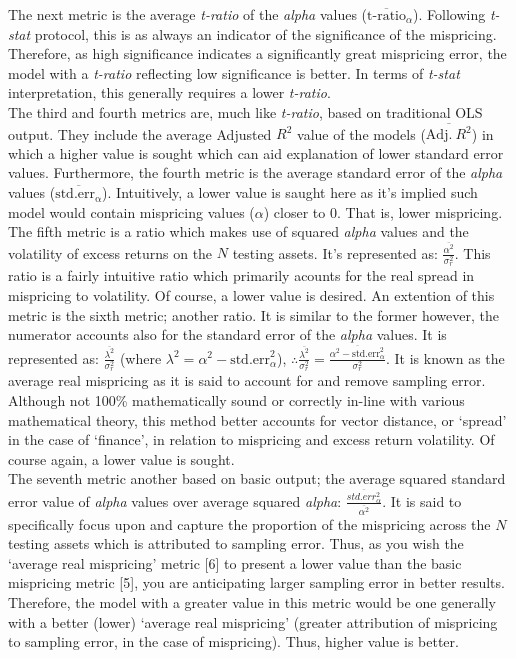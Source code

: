 \documentclass[11pt, english]{article}
\begin{document}
        The next metric is the average \textit{t-ratio} of the \textit{alpha} values ($\overline{\textrm{t-ratio}}_{\alpha}$). Following \textit{t-stat} protocol, this is as always an indicator of the significance of the mispricing. Therefore, as high significance indicates a significantly great mispricing error, the model with a \textit{t-ratio} reflecting low significance is better. In terms of \textit{t-stat} interpretation, this generally requires a lower \textit{t-ratio}.\\

        The third and fourth metrics are, much like \textit{t-ratio}, based on traditional OLS output. They include the average Adjusted $R^2$ value of the models ($\overline{\mathrm{Adj.}\ R^2}$) in which a higher value is sought which can aid explanation of lower standard error values. Furthermore, the fourth metric is the average standard error of the \textit{alpha} values ($\overline{\mathrm{std.err_{\alpha}}}$). Intuitively, a lower value is saught here as it's implied such model would contain mispricing values ($\alpha$) closer to 0. That is, lower mispricing.\\

        The fifth metric is a ratio which makes use of squared \textit{alpha} values and the volatility of excess returns on the $N$ testing assets. It's represented as: $\frac{\overline{\alpha^2}}{\sigma_r^2}$. This ratio is a fairly intuitive ratio which primarily acounts for the real spread in mispricing to volatility. Of course, a lower value is desired. An extention of this metric is the sixth metric; another ratio. It is similar to the former however, the numerator accounts also for the standard error of the \textit{alpha} values. It is represented as: $\frac{\overline{\lambda^2}}{\sigma_r^2}$ (where $\lambda^2=\alpha^2-\textrm{std.err}_{\alpha}^2$), $\therefore\frac{\overline{\lambda^2}}{\sigma_r^2}=\frac{\overline{\alpha^2-\textrm{std.err}_{\alpha}^2}}{\sigma_r^2}$. It is known as the average real mispricing as it is said to account for and remove sampling error. Although not 100\% mathematically sound or correctly in-line with various mathematical theory, this method better accounts for vector distance, or `spread' in the case of `finance', in relation to mispricing and excess return volatility. Of course again, a lower value is sought.\\

        The seventh metric another based on basic output; the average squared standard error value of \textit{alpha} values over average squared \textit{alpha}: $\frac{\overline{std.err_{\alpha}^2}}{\overline{\alpha^2}}$. It is said to specifically focus upon and capture the proportion of the mispricing across the $N$ testing assets which is attributed to sampling error. Thus, as you wish the `average real mispricing' metric [6] to present a lower value than the basic mispricing metric [5], you are anticipating larger sampling error in better results. Therefore, the model with a greater value in this metric would be one generally with a better (lower) `average real mispricing' (greater attribution of mispricing to sampling error, in the case of mispricing). Thus, higher value is better.\\
\end{document}
